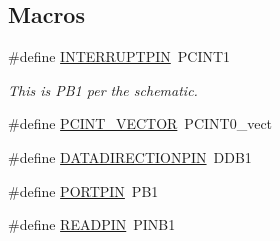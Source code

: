 \subsection*{Macros}
\begin{DoxyCompactItemize}
\item 
\#define \hyperlink{group__speed_ga984097794e94beb18c01b6fcbd8f399d}{I\+N\+T\+E\+R\+R\+U\+P\+T\+P\+IN}~P\+C\+I\+N\+T1
\begin{DoxyCompactList}\small\item\em This is P\+B1 per the schematic. \end{DoxyCompactList}\item 
\#define \hyperlink{group__speed_ga77b45027297b1ff40b5b1249afb852e5}{P\+C\+I\+N\+T\+\_\+\+V\+E\+C\+T\+OR}~P\+C\+I\+N\+T0\+\_\+vect
\item 
\#define \hyperlink{group__speed_ga9142f4c677315955ad0ac6266b615d2c}{D\+A\+T\+A\+D\+I\+R\+E\+C\+T\+I\+O\+N\+P\+IN}~D\+D\+B1
\item 
\#define \hyperlink{group__speed_gaab113cddfa5f8856918dcb65238882ca}{P\+O\+R\+T\+P\+IN}~P\+B1
\item 
\#define \hyperlink{group__speed_ga93a1139e66a97ca289f0f1a73903be06}{R\+E\+A\+D\+P\+IN}~P\+I\+N\+B1
\end{DoxyCompactItemize}

